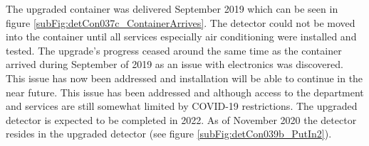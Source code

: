 The upgraded container was delivered September 2019 which can be seen in figure  \ref{subFig:detCon037c_ContainerArrives}. The detector could not be moved into the container until all services especially air conditioning were installed and tested. The upgrade's progress ceased around the same time as the container arrived during September of 2019 as an issue with electronics was discovered. This issue has now been addressed and installation will be able to continue in the near future. This issue has been addressed and although access to the department and services are still somewhat limited by COVID-19 restrictions. The upgraded detector is expected to be completed in 2022. As of November 2020 the detector resides in the upgraded detector (see figure \ref{subFig:detCon039b_PutIn2}).


